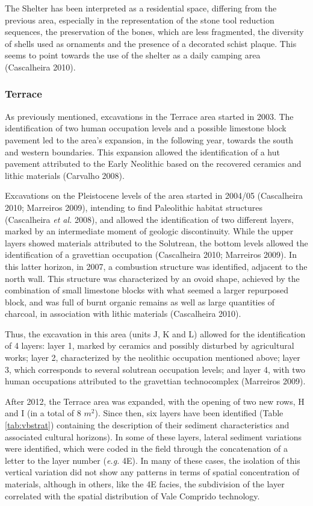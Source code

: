 \documentclass[12pt,twoside]{reedthesis}
\begin{document}
The Shelter has been interpreted as a residential space, differing from the previous area, especially in the representation of the stone tool reduction sequences, the preservation of the bones, which are less fragmented, the diversity of shells used as ornaments and the presence of a decorated schist plaque. This seems to point towards the use of the shelter as a daily camping area (Cascalheira 2010).

\hypertarget{terrace}{%
\subsubsection{Terrace}\label{terrace}}

As previously mentioned, excavations in the Terrace area started in 2003. The identification of two human occupation levels and a possible limestone block pavement led to the area's expansion, in the following year, towards the south and western boundaries. This expansion allowed the identification of a hut pavement attributed to the Early Neolithic based on the recovered ceramics and lithic materials (Carvalho 2008).

Excavations on the Pleistocene levels of the area started in 2004/05 (Cascalheira 2010; Marreiros 2009), intending to find Paleolithic habitat structures (Cascalheira \emph{et al.} 2008), and allowed the identification of two different layers, marked by an intermediate moment of geologic discontinuity. While the upper layers showed materials attributed to the Solutrean, the bottom levels allowed the identification of a gravettian occupation (Cascalheira 2010; Marreiros 2009). In this latter horizon, in 2007, a combustion structure was identified, adjacent to the north wall. This structure was characterized by an ovoid shape, achieved by the combination of small limestone blocks with what seemed a larger repurposed block, and was full of burnt organic remains as well as large quantities of charcoal, in association with lithic materials (Cascalheira 2010).

Thus, the excavation in this area (units J, K and L) allowed for the identification of 4 layers: layer 1, marked by ceramics and possibly disturbed by agricultural works; layer 2, characterized by the neolithic occupation mentioned above; layer 3, which corresponds to several solutrean occupation levels; and layer 4, with two human occupations attributed to the gravettian technocomplex (Marreiros 2009).

After 2012, the Terrace area was expanded, with the opening of two new rows, H and I (in a total of 8 \(m^2\)). Since then, six layers have been identified (Table \ref{tab:vbstrat}) containing the description of their sediment characteristics and associated cultural horizons). In some of these layers, lateral sediment variations were identified, which were coded in the field through the concatenation of a letter to the layer number (\emph{e.g.} 4E). In many of these cases, the isolation of this vertical variation did not show any patterns in terms of spatial concentration of materials, although in others, like the 4E facies, the subdivision of the layer correlated with the spatial distribution of Vale Comprido technology.
\end{document}
